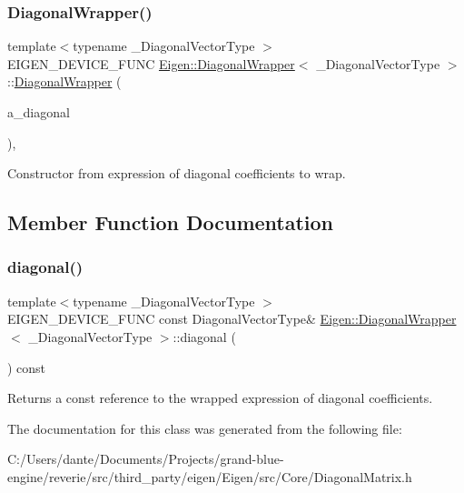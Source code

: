 \subsubsection{\texorpdfstring{DiagonalWrapper()}{DiagonalWrapper()}}
{\footnotesize\ttfamily template$<$typename \+\_\+\+Diagonal\+Vector\+Type $>$ \\
E\+I\+G\+E\+N\+\_\+\+D\+E\+V\+I\+C\+E\+\_\+\+F\+U\+NC \mbox{\hyperlink{class_eigen_1_1_diagonal_wrapper}{Eigen\+::\+Diagonal\+Wrapper}}$<$ \+\_\+\+Diagonal\+Vector\+Type $>$\+::\mbox{\hyperlink{class_eigen_1_1_diagonal_wrapper}{Diagonal\+Wrapper}} (\begin{DoxyParamCaption}\item[{Diagonal\+Vector\+Type \&}]{a\+\_\+diagonal }\end{DoxyParamCaption})\hspace{0.3cm}{\ttfamily [inline]}, {\ttfamily [explicit]}}

Constructor from expression of diagonal coefficients to wrap. 

\subsection{Member Function Documentation}
\mbox{\label{class_eigen_1_1_diagonal_wrapper_a8e84e44aa74ab66f54ffb45e439ef0d5}} 
\subsubsection{\texorpdfstring{diagonal()}{diagonal()}}
{\footnotesize\ttfamily template$<$typename \+\_\+\+Diagonal\+Vector\+Type $>$ \\
E\+I\+G\+E\+N\+\_\+\+D\+E\+V\+I\+C\+E\+\_\+\+F\+U\+NC const Diagonal\+Vector\+Type\& \mbox{\hyperlink{class_eigen_1_1_diagonal_wrapper}{Eigen\+::\+Diagonal\+Wrapper}}$<$ \+\_\+\+Diagonal\+Vector\+Type $>$\+::diagonal (\begin{DoxyParamCaption}{ }\end{DoxyParamCaption}) const\hspace{0.3cm}{\ttfamily [inline]}}

\begin{DoxyReturn}{Returns}
a const reference to the wrapped expression of diagonal coefficients. 
\end{DoxyReturn}


The documentation for this class was generated from the following file\+:\begin{DoxyCompactItemize}
\item 
C\+:/\+Users/dante/\+Documents/\+Projects/grand-\/blue-\/engine/reverie/src/third\+\_\+party/eigen/\+Eigen/src/\+Core/Diagonal\+Matrix.\+h\end{DoxyCompactItemize}
